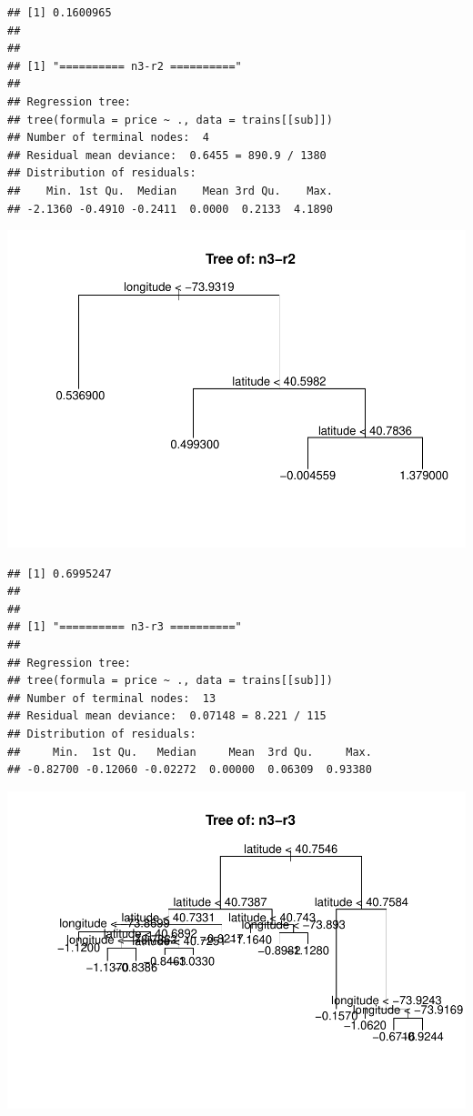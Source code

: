 \documentclass[
]{article}
\begin{document}
\begin{verbatim}
## [1] 0.1600965
## 
## 
## [1] "========== n3-r2 =========="
## 
## Regression tree:
## tree(formula = price ~ ., data = trains[[sub]])
## Number of terminal nodes:  4 
## Residual mean deviance:  0.6455 = 890.9 / 1380 
## Distribution of residuals:
##    Min. 1st Qu.  Median    Mean 3rd Qu.    Max. 
## -2.1360 -0.4910 -0.2411  0.0000  0.2133  4.1890
\end{verbatim}

\includegraphics{project-code_files/figure-latex/unnamed-chunk-14-13.pdf}

\begin{verbatim}
## [1] 0.6995247
## 
## 
## [1] "========== n3-r3 =========="
## 
## Regression tree:
## tree(formula = price ~ ., data = trains[[sub]])
## Number of terminal nodes:  13 
## Residual mean deviance:  0.07148 = 8.221 / 115 
## Distribution of residuals:
##     Min.  1st Qu.   Median     Mean  3rd Qu.     Max. 
## -0.82700 -0.12060 -0.02272  0.00000  0.06309  0.93380
\end{verbatim}

\includegraphics{project-code_files/figure-latex/unnamed-chunk-14-14.pdf}
\end{document}

